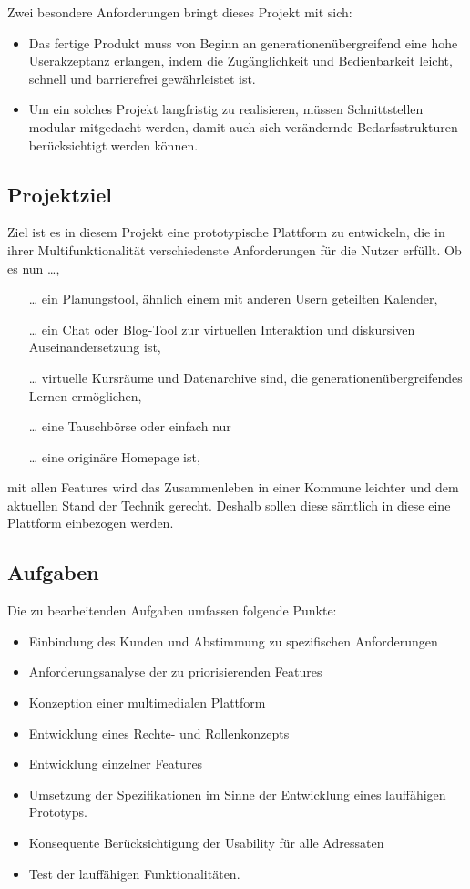 Zwei besondere Anforderungen bringt dieses Projekt mit sich:
\begin{itemize}
  \item Das fertige Produkt muss von Beginn an generationenübergreifend eine hohe Userakzeptanz
  erlangen, indem die Zugänglichkeit und Bedienbarkeit leicht, schnell und barrierefrei
  gewährleistet ist.
  \item Um ein solches Projekt langfristig zu realisieren, müssen Schnittstellen modular mitgedacht werden, damit auch sich verändernde Bedarfsstrukturen berücksichtigt werden können.
\end{itemize}

\subsection{Projektziel}
\label{sub:project-goal}

Ziel ist es in diesem Projekt eine prototypische Plattform zu entwickeln, die in ihrer
Multifunktionalität verschiedenste Anforderungen für die Nutzer erfüllt. Ob es nun …,

\begin{itemize}
  \item[\dots] ein Planungstool, ähnlich einem mit anderen Usern geteilten Kalender,
  \item[\dots] ein Chat oder Blog-Tool zur virtuellen Interaktion und diskursiven Auseinandersetzung ist,
  \item[\dots] virtuelle Kursräume und Datenarchive sind, die generationenübergreifendes Lernen ermöglichen,
  \item[\dots] eine Tauschbörse oder einfach nur
  \item[\dots] eine originäre Homepage ist,

\end{itemize}
mit allen Features wird das Zusammenleben in einer Kommune leichter und dem
aktuellen Stand der Technik gerecht. Deshalb sollen diese sämtlich in diese eine Plattform
einbezogen werden.

\subsection{Aufgaben}
\label{sub:project-tasks}
Die zu bearbeitenden Aufgaben umfassen folgende Punkte:
\begin{itemize}
  \item Einbindung des Kunden und Abstimmung zu spezifischen Anforderungen
  \item Anforderungsanalyse der zu priorisierenden Features
  \item Konzeption einer multimedialen Plattform
  \item Entwicklung eines Rechte- und Rollenkonzepts
  \item Entwicklung einzelner Features
  \item Umsetzung der Spezifikationen im Sinne der Entwicklung eines lauffähigen Prototyps.
  \item Konsequente Berücksichtigung der Usability für alle Adressaten
  \item Test der lauffähigen Funktionalitäten.
\end{itemize}

